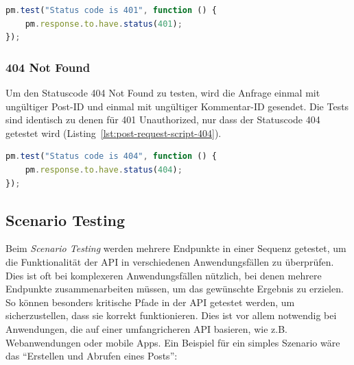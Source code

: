 \begin{lstlisting}[language=JavaScript, caption=\textit{Post-Request} Skript für 401 Unauthorized,label=lst:post-request-script-401]
pm.test("Status code is 401", function () {
    pm.response.to.have.status(401);
});
\end{lstlisting}

\subsubsection*{404 Not Found}

Um den Statuscode 404 Not Found zu testen, wird die Anfrage einmal mit ungültiger Post-ID und einmal mit ungültiger Kommentar-ID gesendet. 
Die Tests sind identisch zu denen für 401 Unauthorized, nur dass der Statuscode 404 getestet wird (Listing~\ref{lst:post-request-script-404}).

\begin{lstlisting}[language=JavaScript, caption=\textit{Post-Request} Skript für 404 Not Found,label=lst:post-request-script-404]
pm.test("Status code is 404", function () {
    pm.response.to.have.status(404);
});
\end{lstlisting}

\subsection{Scenario Testing}

Beim \textit{Scenario Testing} werden mehrere Endpunkte in einer Sequenz getestet, um die Funktionalität der \ac{API} in verschiedenen Anwendungsfällen zu überprüfen. 
Dies ist oft bei komplexeren Anwendungsfällen nützlich, bei denen mehrere Endpunkte zusammenarbeiten müssen, um das gewünschte Ergebnis zu erzielen. 
So können besonders kritische Pfade in der \ac{API} getestet werden, um sicherzustellen, dass sie korrekt funktionieren. 
Dies ist vor allem notwendig bei Anwendungen, die auf einer umfangricheren \ac{API} basieren, wie z.B. Webanwendungen oder mobile Apps.
Ein Beispiel für ein simples Szenario wäre das ``Erstellen und Abrufen eines Posts'':

